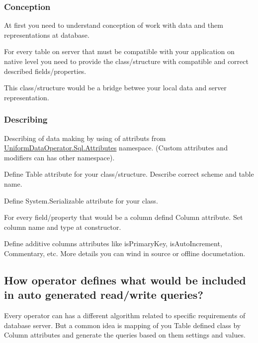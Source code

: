 \subsubsection*{Conception}

At first you need to understand conception of work with data and them representations at database.

For every table on server that must be compatible with your application on native level you need to provide the class/structure with compatible and correct described fields/properties.

This class/structure would be a bridge betwee your local data and server representation.

\subsubsection*{Describing}

Describing of data making by using of attributs from {\ttfamily \mbox{\hyperlink{namespace_uniform_data_operator_1_1_sql_1_1_attributes}{Uniform\+Data\+Operator.\+Sql.\+Attributes}}} namespace. (Custom attributes and modifiers can has other namespace).


\begin{DoxyEnumerate}
\item Define {\ttfamily Table} attribute for your class/structure. Describe correct scheme and table name.
\item Define {\ttfamily System.\+Serializable} attribute for your class.
\item For every field/property that would be a column defind {\ttfamily Column} attribute. Set column name and type at constructor.
\item Define additive columns\textquotesingle{} attributes like {\ttfamily is\+Primary\+Key}, {\ttfamily is\+Auto\+Increment}, {\ttfamily Commentary}, etc. More details you can wind in source or offline documetation.
\end{DoxyEnumerate}

\subsection*{How operator defines what would be included in auto generated read/write queries?}

Every operator can has a different algorithm related to specific requirements of database server. But a common idea is mapping of you \textquotesingle{}Table\textquotesingle{} defined class by {\ttfamily Column} attributes and generate the queries based on them settings and values.

